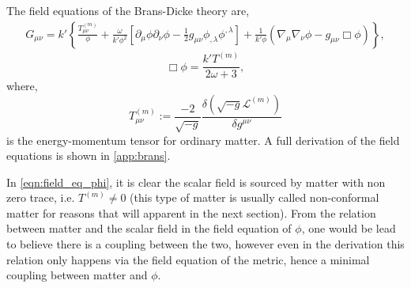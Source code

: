 The field equations of the Brans-Dicke theory are,
\begin{align}
G_{\mu\nu}=k'\left\{\frac{T_{\mu\nu}^{(m)}}{\phi}+\frac{\omega}{k'\phi^2}\left[\partial_\mu \phi \partial_\nu \phi-\frac{1}{2}g_{\mu\nu}\phi_{,\lambda}\phi^{,\lambda}\right]+\frac{1}{k'\phi}\left(\nabla_\mu\nabla_\nu\phi-g_{\mu\nu}\Box\phi\right)\right\},
\label{eqn:field_eq_metric}
\end{align}
\begin{equation}
    \Box\phi=\frac{k'T^{(m)}}{2\omega+3},
    \label{eqn:field_eq_phi}
\end{equation}
where,
\begin{equation}
    T_{\mu\nu}^{(m)} := \frac{-2}{\sqrt{-g}} \frac{\delta\left(\sqrt{-g} \mathcal{L}^{(m)}\right)}{\delta g^{\mu\nu}}
    \label{eqn:def_em_tensor}
\end{equation}
is the energy-momentum tensor for ordinary matter. A full derivation of the field equations is shown in \cref{app:brans}.

In \cref{eqn:field_eq_phi}, it is clear the scalar field is sourced by matter with non zero trace, i.e. $T^{(m)}\neq 0$ (this type of matter is usually called non-conformal matter for reasons that will apparent in the next section). From the relation between matter and the scalar field in the field equation of $\phi$, one would be lead to believe there is a coupling between the two, however even in the derivation this relation only happens via the field equation of the metric, hence a minimal coupling between matter and $\phi$.

